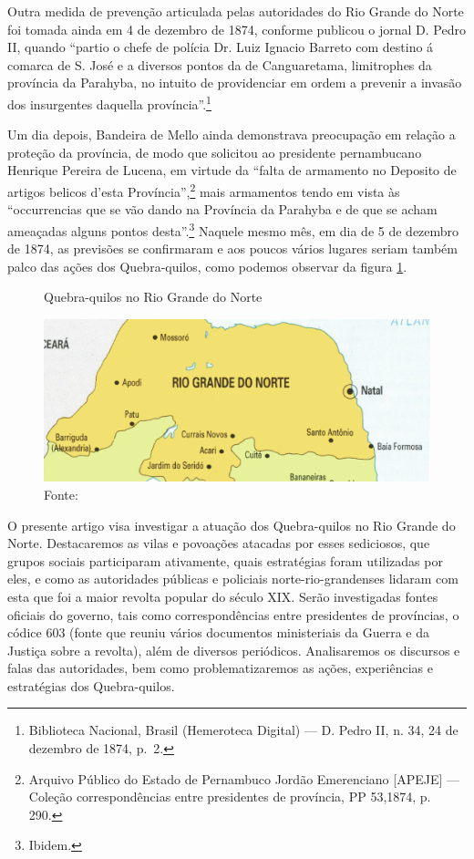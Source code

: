 \begin{refsection}
Outra medida de prevenção articulada pelas autoridades do Rio Grande do Norte foi tomada ainda em 4 de dezembro de 1874, conforme publicou o jornal D. Pedro II, quando “partio o chefe de polícia Dr. Luiz Ignacio Barreto com destino á comarca de S. José e a diversos pontos da de Canguaretama, limitrophes da província da Parahyba, no intuito de providenciar em ordem a prevenir a invasão dos insurgentes daquella província”.\footnote{Biblioteca Nacional, Brasil (Hemeroteca Digital) --- D. Pedro II, n. 34, 24 de dezembro de 1874, p.~2.}

Um dia depois, Bandeira de Mello ainda demonstrava preocupação em relação a proteção da província, de modo que solicitou ao presidente pernambucano Henrique Pereira de Lucena, em virtude da “falta de armamento no Deposito de artigos belicos d’esta Província”,\footnote{Arquivo Público do Estado de Pernambuco Jordão Emerenciano [APEJE] --- Coleção correspondências entre presidentes de província, PP 53,1874, p. 290.} mais armamentos tendo em vista às “occurrencias que se vão dando na Província da Parahyba e de que se acham ameaçadas alguns pontos desta”.\footnote{Ibidem.} Naquele mesmo mês, em dia de 5 de dezembro de 1874, as previsões se confirmaram e aos poucos vários lugares seriam também palco das ações dos Quebra-quilos, como podemos observar da figura \ref{fig:quebra-quilo-rn}. 

\begin{figure}[ht]%
    \centering%
    \caption{Quebra-quilos no Rio Grande do Norte}%
    \includegraphics[width=.75\textwidth]{articles/03-nao-ao-peso-nao-ao-r/01-rn.png}%
    \caption*{Fonte: \textcite[p.~17]{Monteiro1993}}%
    \label{fig:quebra-quilo-rn}%
\end{figure}%

O presente artigo visa investigar a atuação dos Quebra-quilos no Rio Grande do Norte. Destacaremos as vilas e povoações atacadas por esses sediciosos, que grupos sociais participaram ativamente, quais estratégias foram utilizadas por eles, e como as autoridades públicas e policiais norte-rio-grandenses lidaram com esta que foi a maior revolta popular do século XIX. Serão investigadas fontes oficiais do governo, tais como correspondências entre presidentes de províncias, o códice 603 (fonte que reuniu vários documentos ministeriais da Guerra e da Justiça sobre a revolta), além de diversos periódicos. Analisaremos os discursos e falas das autoridades, bem como problematizaremos as ações, experiências e estratégias dos Quebra-quilos.


\end{refsection}
